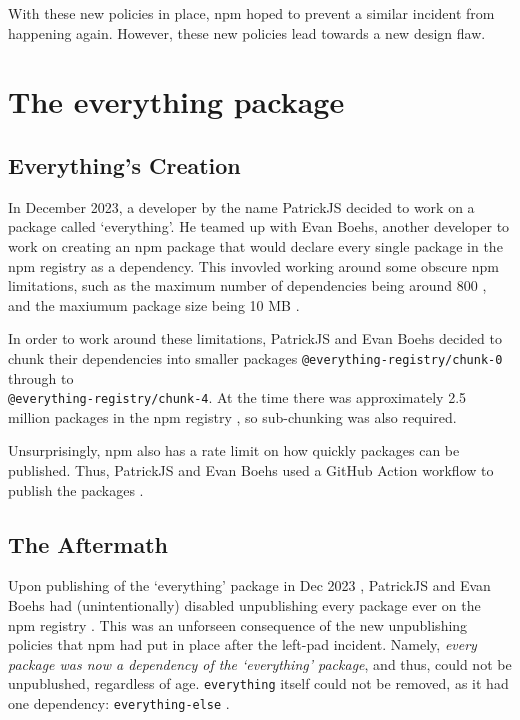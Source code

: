 \documentclass[acmsmall]{acmart}
\begin{document}
With these new policies in place, npm hoped to prevent a similar incident from happening again.
However, these new policies lead towards a new design flaw.

\section{The everything package}
\subsection{Everything's Creation}
In December 2023, a developer by the name PatrickJS decided to work on a package
called `everything'. He teamed up with Evan Boehs, another developer to work on
creating an npm package that would declare every single package in the npm
registry as a dependency. This invovled working around some obscure npm
limitations, such as the maximum number of dependencies being around 800
\cite{youtube-everything}, and the maxiumum package size being 10 MB
\cite{youtube-everything}.

In order to work around these limitations, PatrickJS and Evan Boehs decided to chunk their
dependencies into smaller packages \lstinline|@everything-registry/chunk-0| through to \\
\lstinline|@everything-registry/chunk-4|. At the time there was approximately 2.5 million
packages in the npm registry \cite{youtube-everything}, so sub-chunking was also required.

Unsurprisingly, npm also has a rate limit on how quickly packages can be published. Thus,
PatrickJS and Evan Boehs used a GitHub Action workflow to publish the packages \cite{youtube-everything}.

\subsection{The Aftermath}
Upon publishing of the `everything' package in Dec 2023 \cite{npm-everything},
PatrickJS and Evan Boehs had (unintentionally) disabled unpublishing every
package ever on the npm registry \cite{youtube-everything}. This was an
unforseen consequence of the new unpublishing policies that npm had put in place
after the left-pad incident. Namely, \textit{every package was now a dependency
  of the `everything' package}, and thus, could not be unpublushed, regardless of
age. \lstinline|everything| itself could not be removed, as it had one
dependency: \lstinline|everything-else| \cite{npm-everything-else}.
\end{document}
